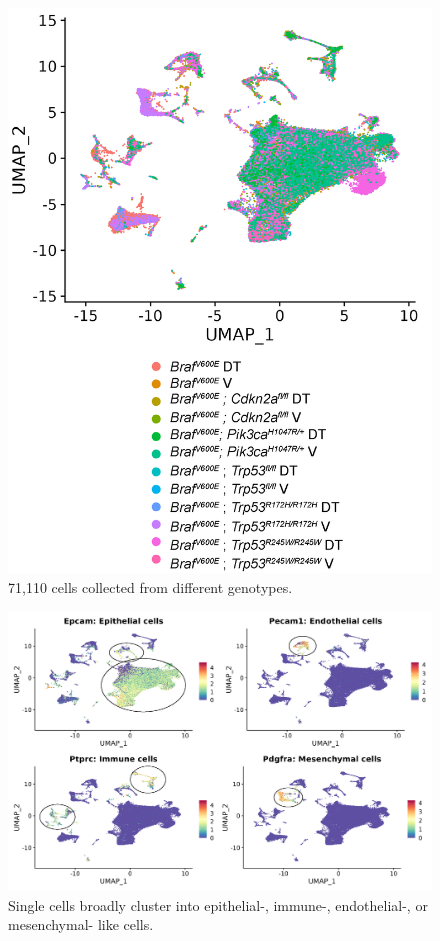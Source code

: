 \begin{figure}
\hypertarget{fig:04}{%
\centering
\includegraphics[width=1\textwidth,height=\textheight]{images/scrna_1.png}
\caption{71,110 cells collected from different genotypes.}\label{fig:04}
}
\end{figure}

\begin{figure}
\hypertarget{fig:04}{%
\centering
\includegraphics[width=1\textwidth,height=\textheight]{images/scrna_2.png}
\caption{Single cells broadly cluster into epithelial-, immune-, endothelial-, or mesenchymal- like cells.}\label{fig:04}
}
\end{figure}

